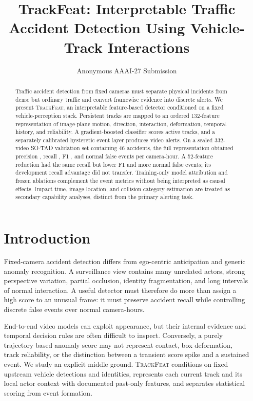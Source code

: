 \documentclass[letterpaper]{article}
\title{TrackFeat: Interpretable Traffic Accident Detection Using Vehicle-Track Interactions}
\author{Anonymous AAAI-27 Submission}
\newcommand{\method}{\textsc{TrackFeat}}
\begin{document}
\maketitle

\begin{abstract}
Traffic accident detection from fixed cameras must separate physical incidents from dense but ordinary traffic and convert framewise evidence into discrete alerts. We present \method{}, an interpretable feature-based detector conditioned on a fixed vehicle-perception stack. Persistent tracks are mapped to an ordered 132-feature representation of image-plane motion, direction, interaction, deformation, temporal history, and reliability. A gradient-boosted classifier scores active tracks, and a separately calibrated hysteretic event layer produces video alerts. On a sealed 332-video SO-TAD validation set containing 46 accidents, the full representation obtained precision \FullPrecision{}, recall \FullRecall{}, F1 \FullFOne{}, and \FullFPH{} normal false events per camera-hour. A 52-feature reduction had the same recall but lower F1 and more normal false events; its development recall advantage did not transfer. Training-only model attribution and frozen ablations complement the event metrics without being interpreted as causal effects. Impact-time, image-location, and collision-category estimation are treated as secondary capability analyses, distinct from the primary alerting task.
\end{abstract}

\section{Introduction}
Fixed-camera accident detection differs from ego-centric anticipation and generic anomaly recognition. A surveillance view contains many unrelated actors, strong perspective variation, partial occlusion, identity fragmentation, and long intervals of normal interaction. A useful detector must therefore do more than assign a high score to an unusual frame: it must preserve accident recall while controlling discrete false events over normal camera-hours.

End-to-end video models can exploit appearance, but their internal evidence and temporal decision rules are often difficult to inspect. Conversely, a purely trajectory-based anomaly score may not represent contact, box deformation, track reliability, or the distinction between a transient score spike and a sustained event. We study an explicit middle ground. \method{} conditions on fixed upstream vehicle detections and identities, represents each current track and its local actor context with documented past-only features, and separates statistical scoring from event formation.
\end{document}
